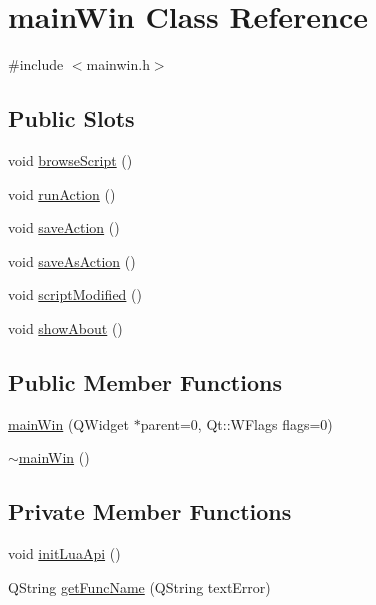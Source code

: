 \hypertarget{classmain_win}{\section{main\-Win Class Reference}
\label{classmain_win}
}


{\ttfamily \#include $<$mainwin.\-h$>$}

\subsection*{Public Slots}
\begin{DoxyCompactItemize}
\item 
void \hyperlink{classmain_win_aeea495e3a2a50dab104a42eb0321ae17}{browse\-Script} ()
\item 
void \hyperlink{classmain_win_acf0324a155856e59cdea5ec5698f5514}{run\-Action} ()
\item 
void \hyperlink{classmain_win_ab7665b16866b9aeecbe430ef17769ac4}{save\-Action} ()
\item 
void \hyperlink{classmain_win_abc27501a5ed3933840fd72d5c052c4fa}{save\-As\-Action} ()
\item 
void \hyperlink{classmain_win_affa3129c6021871bfc6ab5acccb0a9c5}{script\-Modified} ()
\item 
void \hyperlink{classmain_win_a971bee9dff02167121566f9a4444af4e}{show\-About} ()
\end{DoxyCompactItemize}
\subsection*{Public Member Functions}
\begin{DoxyCompactItemize}
\item 
\hyperlink{classmain_win_a837aa6380bc037afd022629b56b7aca9}{main\-Win} (Q\-Widget $\ast$parent=0, Qt\-::\-W\-Flags flags=0)
\item 
\hyperlink{classmain_win_a70326ccd243eb2060b1b5a3150025a9d}{$\sim$main\-Win} ()
\end{DoxyCompactItemize}
\subsection*{Private Member Functions}
\begin{DoxyCompactItemize}
\item 
void \hyperlink{classmain_win_a9c0cfda2b24fa6259874caf7ccd4b908}{init\-Lua\-Api} ()
\item 
Q\-String \hyperlink{classmain_win_ab00961de109eaf86fceed0dc39d53fe8}{get\-Func\-Name} (Q\-String text\-Error)
\end{DoxyCompactItemize}
